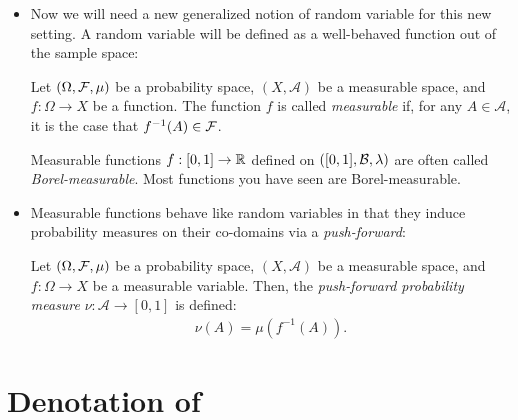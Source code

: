 \documentclass{tufte-handout}
\begin{document}
\begin{itemize}
  \item Now we will need a new generalized notion of random variable for this new 
  setting. A random variable will be defined as a well-behaved function out of 
  the sample space:
  \begin{definition}
    Let $(\Omega, \mathcal{F}, \mu)$ be a probability space, $(X, \mathcal{A})$ be 
    a measurable space, and $f : \Omega \rightarrow X$ 
    be a function. The function $f$ is called \emph{measurable} if, 
    for any $A \in \mathcal{A}$, it is the case that $f^{-1}(A) \in \mathcal{F}$.
  \end{definition}

  Measurable functions $f : [0,1] \rightarrow \mathbb{R}$ defined on $([0,1], \mathcal{B},
  \lambda)$ are often called \emph{Borel-measurable}. Most functions you have
  seen are Borel-measurable.

  \item Measurable functions behave like random variables in that they induce 
  probability measures on their co-domains via a \emph{push-forward}:
  \begin{definition}
    Let $(\Omega, \mathcal{F}, \mu)$ be a probability space, $(X, \mathcal{A})$ be a 
    measurable space, and $f: \Omega \rightarrow X$ 
    be a measurable variable. Then, the \emph{push-forward probability measure}
    $\nu : \mathcal{A} \rightarrow [0,1]$ is defined:
    \begin{align}
      \nu(A) = \mu(f^{-1}(A)).
    \end{align}
  \end{definition}

\end{itemize}

\section{Denotation of \cont{}}
\end{document}
